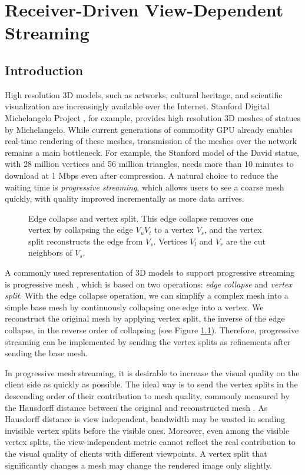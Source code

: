 \chapter{Receiver-Driven View-Dependent Streaming}
\section{Introduction}
\label{s:dstream:intro}
    High resolution 3D models, such as artworks,
    cultural heritage, and scientific visualization are increasingly available over 
    the Internet. Stanford Digital Michelangelo Project \cite{levoy00digital},
    for example, provides high resolution 3D meshes of statues by Michelangelo.
    While current generations of commodity GPU already enables real-time rendering of these meshes, transmission of the meshes over the network remains
    a main bottleneck. For example, the Stanford model of the David statue, with 28 million vertices
    and 56 million triangles, needs more than 10 minutes to download at 1 Mbps
    even after compression. A natural choice to reduce the waiting time 
    is \emph{progressive streaming}, which allows
    users to see a coarse mesh quickly, with quality improved incrementally as
    more data arrives.

    \begin{figure}
    \centering
    \caption{Edge collapse and vertex split.
    This edge collapse removes one vertex by collapsing the edge $V_uV_t$ to a vertex $V_s$, and the
    vertex split reconstructs the edge from $V_s$. Vertices $V_l$ and $V_r$ are
    the cut neighbors of $V_s$.\label{dstream:split}}
    \end{figure}
    A commonly used representation of 3D models to support progressive streaming is
    progressive mesh \cite{237216}, which is based on two operations: 
    \emph{edge collapse} and \emph{vertex split}. 
    With the edge collapse operation,
    we can simplify a complex mesh into a simple base mesh
    by continuously collapsing one edge into
    a vertex. We reconstruct the original mesh
    by applying vertex split, the inverse of the edge collapse, in the
    reverse order of collapsing (see Figure \ref{dstream:split}). Therefore,
    progressive streaming can be implemented by sending the vertex
    splits as refinements after sending the base mesh.

    In progressive mesh streaming, it is desirable to increase the visual quality
    on the client side as quickly as possible.
    The ideal way is to send the vertex splits
    in the descending order of their contribution to
    mesh quality, commonly measured by the Hausdorff distance between
    the original and reconstructed mesh \cite{cignoni98metro}.
    As Hausdorff distance is view independent, 
    bandwidth may be wasted in sending invisible vertex splits
    before the visible ones. Moreover, even among the visible vertex splits,
    the view-independent metric cannot 
    reflect the real contribution to the visual quality of
    clients with different viewpoints. A vertex split that significantly
    changes a mesh may change the rendered image 
    only slightly.

